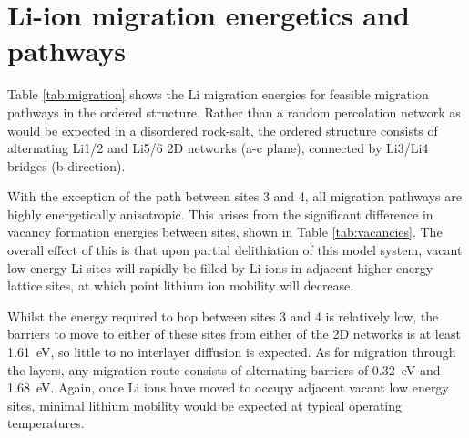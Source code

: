 \newpage


\begin{table}[t] %
\centering
\caption{Li vacancy migration energies and path lengths in ordered .}
\label{tab:migration}
\end{table}

\section{Li-ion migration energetics and pathways}
\label{sec:migration}
Table \ref{tab:migration} shows the Li migration energies for feasible migration pathways in the ordered  structure.
Rather than a random percolation network as would be expected in a disordered rock-salt, the ordered structure consists of alternating Li1/2 and Li5/6 2D networks (a-c plane), connected by Li3/Li4 bridges (b-direction). 


With the exception of the path between sites 3 and 4, all migration pathways are highly energetically anisotropic.
This arises from the significant difference in vacancy formation energies between sites, shown in Table \ref{tab:vacancies}.
The overall effect of this is that upon partial delithiation of this model system, vacant low energy Li sites will rapidly be filled by Li ions in adjacent higher energy lattice sites, at which point lithium ion mobility will decrease.

Whilst the energy required to hop between sites 3 and 4 is relatively low, the barriers to move to either of these sites from either of the 2D networks is at least \SI{1.61}{\electronvolt}, so little to no interlayer diffusion is expected.
As for migration through the layers, any migration route consists of alternating barriers of \SI{0.32}{\electronvolt} and \SI{1.68}{\electronvolt}.
Again, once Li ions have moved to occupy adjacent vacant low energy sites, minimal lithium mobility would be expected at typical operating temperatures.

